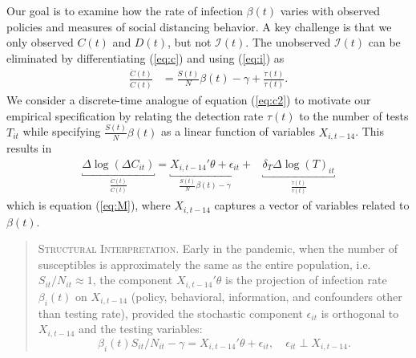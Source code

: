 \documentclass[3p, longtitle]{elsarticle}
\theoremstyle{definition}
\providecommand{\Infected}{{\mathcal{I}}}
\begin{document}
Our goal is to examine how the rate of infection $\beta(t)$ varies with observed policies
and measures of social distancing behavior. A key challenge is that we only
observed $C(t)$ and $D(t)$, but not $\Infected(t)$. The unobserved $\Infected(t)$ can
be eliminated by differentiating (\ref{eq:c}) and using (\ref{eq:i})  as
\begin{align}
  \frac{\ddot{C}(t)}{\dot{C}(t)}
              & =
                \frac{S(t)}{N} \beta(t) -\gamma  + \frac{\dot{\tau}(t)}{\tau(t)}. \label{eq:c2}
\end{align}
We consider a discrete-time analogue of equation (\ref{eq:c2}) to motivate our empirical
specification by relating the detection rate $\tau(t)$  to the number of tests $T_{it}$ while specifying $\frac{S(t)}{N}\beta(t)$ as a linear function of variables $X_{i,t-14}$.
This results in
\begin{align}
  \underbracket{\Delta \log(\Delta C_{it})}_{\frac{\ddot{C}(t)}{\dot{C}(t)}}
  =
      \underbracket{X_{i,t-14}' \theta + \epsilon_{it}}_{\frac{S(t)}{N}\beta(t) -\gamma}
       +
       & \underbracket{\delta_T \Delta
      \log(T)_{it}}_{\frac{\dot{\tau}(t)}{\tau(t)} } \nonumber
\end{align}
which is equation (\ref{eq:M}), where $X_{i,t-14}$ captures a vector of variables related to $\beta(t)$.

\begin{quote}
\textsc{Structural Interpretation}. Early in the pandemic, when
the number of susceptibles is approximately the same as the entire population, i.e. $S_{it}/N_{it} \approx 1$, the component $X_{i,t-14}' \theta$
is the projection of infection rate $ \beta_i(t)$ on   $X_{i,t-14}$ (policy, behavioral, information, and confounders other than testing rate), provided
the stochastic component $\epsilon_{it}$ is orthogonal
to $X_{i,t-14}$ and the testing variables:
$$
\beta_i(t)S_{it}/N_{it}  - \gamma = X_{i,t-14}' \theta + \epsilon_{it}, \quad \epsilon_{it} \perp X_{i,t-14}.
$$
\end{quote}
\end{document}
